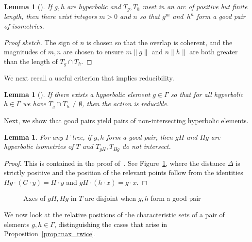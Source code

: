 \documentclass[11pt]{amsart}
\newcommand*{\svgfignormal}[1]{\fontsize{9pt}{9pt}\selectfont}
\numberwithin{equation}{section}
\numberwithin{figure}{section}
\newtheorem{lemma}[theorem]{Lemma}
\theoremstyle{definition}
\theoremstyle{plain}
\begin{document}
\begin{lemma}[{\cite[Remark~3.3]{CM87:GroupActions}}]
If $g,h$ are hyperbolic and $T_g,T_h$ meet in an arc of positive but
finite length, then there exist integers $m>0$ and $n$ so that $g^m$
and~$h^n$
form a good pair of isometries.
\label{lem:powers_goodpair}
\end{lemma}

\begin{proof}[Proof sketch]
   The sign of $n$ is chosen so that the overlap is coherent, and the magnitudes of $m,n$ are chosen
to ensure $m \| g \|$ and $n \|h\|$ are both greater than the length  of $T_g \cap T_h$.
\end{proof}

We next recall a useful criterion that implies reducibility.
\begin{lemma}[{\cite[Lemma~2.1]{CM87:GroupActions}}]
    If there exists a hyperbolic element $g \in \Gamma$ so that for all hyperbolic $h \in \Gamma$ we have  $T_g \cap T_h \neq \emptyset$, then the action is reducible.
    \label{lem:CM_red_criterion}
\end{lemma}

Next, we show that good pairs yield pairs of non-intersecting
hyperbolic elements.

\begin{lemma}
  For any $\Gamma$-tree, if $g,h$ form a good pair, then $gH$ and $Hg$ are hyperbolic isometries of $T$ and $T_{gH}, T_{Hg}$ do not intersect.
    \label{lem:oppgoodpair}
\end{lemma}
\begin{proof}
   This is contained in the proof
   of~\cite[Lemma~3.4]{CM87:GroupActions}. See Figure~\ref{fig:trees_goodpair}, where the distance $\Delta$ is strictly positive and the position of the relevant points follow from the identities $Hg \cdot (G \cdot y) = H \cdot y$ and $gH \cdot (h \cdot x) = g \cdot x$.
\end{proof}

\begin{figure}[ht]
     \centering
\resizebox{80mm}{!}{\svgfignormal{trees_goodpair}}
    \caption{Axes of $gH, Hg$ in $T$ are disjoint when $g,h$ form a good pair}\label{fig:trees_goodpair}
\end{figure}

We now look at the relative positions of the characteristic sets of a pair of elements $g,h \in \Gamma$, distinguishing the cases that arise in Proposition~\ref{prop:max_twice}.
\end{document}
